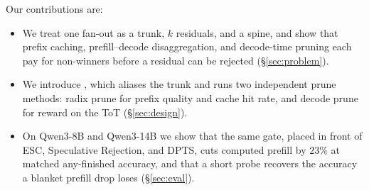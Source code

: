 Our contributions are:
\begin{itemize}
\item We treat one fan-out as a trunk, $k$ residuals, and a spine, and show that prefix caching, prefill--decode disaggregation, and decode-time pruning each pay for non-winners before a residual can be rejected (\S\ref{sec:problem}).
\item We introduce \sys, which aliases the trunk and runs two independent prune methods: radix prune for prefix quality and cache hit rate, and decode prune for reward on the ToT (\S\ref{sec:design}).
\item On Qwen3-8B and Qwen3-14B we show that the same gate, placed in front of ESC, Speculative Rejection, and DPTS, cuts computed prefill by $23\%$ at matched any-finished accuracy, and that a short probe recovers the accuracy a blanket prefill drop loses (\S\ref{sec:eval}).
\end{itemize}
